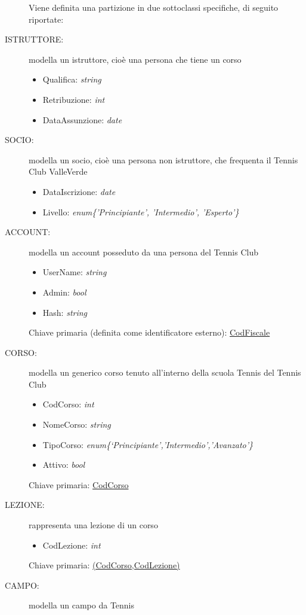 \begin{description}
Viene definita una partizione in due sottoclassi specifiche, di seguito riportate:
\item[ISTRUTTORE:] modella un istruttore, cioè una persona che tiene un corso
\begin{itemize}
\item Qualifica: \textit{string} \hfill 
\item Retribuzione: \textit{int} \hfill 
\item DataAssunzione: \textit{date} \hfill 
\end{itemize}
\item[SOCIO:] modella un socio, cioè una persona non istruttore, che frequenta il Tennis Club ValleVerde
\begin{itemize}
\item DataIscrizione: \textit{date} \hfill 
\item Livello: \textit{enum\{'Principiante', 'Intermedio', 'Esperto'\}} \hfill 
\end{itemize}
\item[ACCOUNT:] modella un account posseduto da una persona del Tennis Club
\begin{itemize}
\item UserName: \textit{string} \hfill 
\item Admin: \textit{bool} \hfill 
\item Hash: \textit{string} \hfill 
\end{itemize}
Chiave primaria (definita come identificatore esterno): \underline{CodFiscale} \hfill 
\item[CORSO:] modella un generico corso tenuto all’interno della scuola Tennis del Tennis Club
\begin{itemize}
\item CodCorso: \textit{int} \hfill
\item NomeCorso: \textit{string} \hfill
\item TipoCorso: \textit{enum\{‘Principiante’,’Intermedio’,’Avanzato’\}} \hfill
\item Attivo: \textit{bool} \hfill
\end{itemize}
Chiave primaria: \underline{CodCorso} \hfill 
\item[LEZIONE:] rappresenta una lezione di un corso
\begin{itemize}
\item CodLezione: \textit{int} \hfill 
\end{itemize}
Chiave primaria: \underline{(CodCorso,CodLezione)} \hfill 
\item[CAMPO:] modella un campo da Tennis

\end{description}
